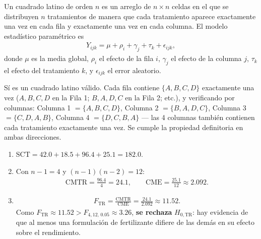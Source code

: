 \begin{solproblema}[prob:e90018f]
	Un cuadrado latino de orden $n$ es un arreglo de $n \times n$ celdas en el que se distribuyen $n$ tratamientos de manera que cada tratamiento aparece exactamente una vez en cada fila y exactamente una vez en cada columna. El modelo estadístico paramétrico es
	\begin{align}
		Y_{ijk} = \mu + \rho_i + \gamma_j + \tau_k + \epsilon_{ijk},
	\end{align}
	donde $\mu$ es la media global, $\rho_i$ el efecto de la fila $i$, $\gamma_j$ el efecto de la columna $j$, $\tau_k$ el efecto del tratamiento $k$, y $\epsilon_{ijk}$ el error aleatorio.
\end{solproblema}

\begin{solproblema}[prob:8e9e6f8]
	Sí es un cuadrado latino válido. Cada fila contiene $\{A,B,C,D\}$ exactamente una vez ($A,B,C,D$ en la Fila 1; $B,A,D,C$ en la Fila 2; etc.), y verificando por columnas: Columna 1 $=\{A,B,C,D\}$, Columna 2 $=\{B,A,D,C\}$, Columna 3 $=\{C,D,A,B\}$, Columna 4 $=\{D,C,B,A\}$ — las 4 columnas también contienen cada tratamiento exactamente una vez. Se cumple la propiedad definitoria en ambas direcciones.
\end{solproblema}

\begin{solproblema}[prob:f64d8dc]
	\begin{enumerate}
		\item $\text{SCT} = 42.0 + 18.5 + 96.4 + 25.1 = 182.0$.
		\item Con $n-1 = 4$ y $(n-1)(n-2) = 12$:
		\begin{align}
			\text{CMTR} = \frac{96.4}{4} = 24.1, \qquad \text{CME} = \frac{25.1}{12} \approx 2.092.
		\end{align}
		\item
		\begin{align}
			F_{\text{TR}} = \frac{\text{CMTR}}{\text{CME}} = \frac{24.1}{2.092} \approx 11.52.
		\end{align}
		Como $F_{\text{TR}} \approx 11.52 > F_{4,12,\,0.05} \approx 3.26$, \textbf{se rechaza} $H_{0,\text{TR}}$: hay evidencia de que al menos una formulación de fertilizante difiere de las demás en su efecto sobre el rendimiento.
	\end{enumerate}
\end{solproblema}

